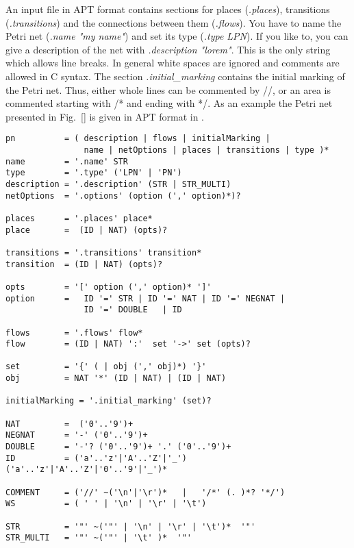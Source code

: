 \documentclass[12pt,twoside,a4paper,openright]{memoir}
\begin{document}
An input file in APT format contains sections for places (\emph{.places}), transitions (\emph{.transitions}) 
and the connections between them (\emph{.flows}). You have to name the Petri net
(\emph{.name "my name"}) and set its type (\emph{.type LPN}). If you like to, you can give a 
description of the net with \emph{.description "lorem"}.
This is the only string which allows line breaks.
In general white spaces are ignored and comments are allowed in C syntax. 
The section \emph{.initial\_marking} contains the initial marking of the Petri net.
Thus, either whole lines can be commented by //, or an area is commented starting with /* and ending with */.
As an example the Petri net presented in Fig.~\ref{} is 
given in APT format in \todo{}.
\begin{lstlisting}[captionpos=b, caption=Simplified Grammar of the APT format for labeled Petri nets, label = lst:grammar,language=ebnf]
pn     		= ( description | flows | initialMarking |
 				name | netOptions | places | transitions | type )*
name   		= '.name' STR
type   		= '.type' ('LPN' | 'PN')
description = '.description' (STR | STR_MULTI)
netOptions  = '.options' (option (',' option)*)?

places      = '.places' place*
place       =  (ID | NAT) (opts)? 

transitions = '.transitions' transition*
transition  = (ID | NAT) (opts)? 

opts 		= '[' option (',' option)* ']'
option 		= 	ID '=' STR | ID '=' NAT	| ID '=' NEGNAT |
				ID '=' DOUBLE	| ID
	
flows 		= '.flows' flow*
flow  		= (ID | NAT) ':'  set '->' set (opts)?

set			= '{' ( | obj (',' obj)*) '}'
obj			= NAT '*' (ID | NAT) | (ID | NAT)

initialMarking = '.initial_marking' (set)?

NAT			=  ('0'..'9')+
NEGNAT		= '-' ('0'..'9')+
DOUBLE		= '-'? ('0'..'9')+ '.' ('0'..'9')+
ID			= ('a'..'z'|'A'..'Z'|'_') ('a'..'z'|'A'..'Z'|'0'..'9'|'_')*

COMMENT		= ('//' ~('\n'|'\r')*	|   '/*' (. )*? '*/')
WS			= ( ' ' | '\n' | '\r' | '\t')

STR			= '"' ~('"' | '\n' | '\r' | '\t')*  '"'
STR_MULTI	= '"' ~('"' | '\t' )*  '"'
\end{lstlisting}
\end{document}
